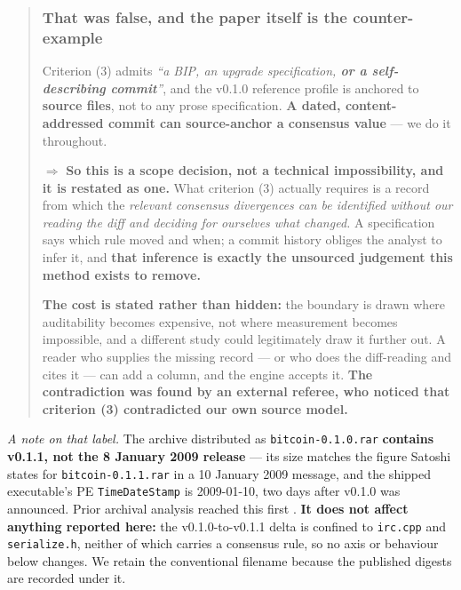 \documentclass[
]{article}
\begin{document}
\begin{quote}
\mbox{}%
\subsubsection{That was false, and the paper itself is the
counter-example}\label{that-was-false-and-the-paper-itself-is-the-counter-example}

Criterion (3) admits \emph{``a BIP, an upgrade specification, \textbf{or
a self-describing commit}''}, and the v0.1.0 reference profile is
anchored to \textbf{source files}, not to any prose specification.
\textbf{A dated, content-addressed commit can source-anchor a consensus
value} --- we do it throughout.

\(\Rightarrow\) \textbf{So this is a scope decision, not a technical
impossibility, and it is restated as one.} What criterion (3) actually
requires is a record from which the \emph{relevant consensus divergences
can be identified without our reading the diff and deciding for
ourselves what changed.} A specification says which rule moved and when;
a commit history obliges the analyst to infer it, and \textbf{that
inference is exactly the unsourced judgement this method exists to
remove.}

\textbf{The cost is stated rather than hidden:} the boundary is drawn
where auditability becomes expensive, not where measurement becomes
impossible, and a different study could legitimately draw it further
out. A reader who supplies the missing record --- or who does the
diff-reading and cites it --- can add a column, and the engine accepts
it. \textbf{The contradiction was found by an external referee, who
noticed that criterion (3) contradicted our own source model.}
\end{quote}

\emph{A note on that label.} The archive distributed as
\texttt{bitcoin-0.1.0.rar} \textbf{contains v0.1.1, not the 8 January
2009 release} --- its size matches the figure Satoshi states for
\texttt{bitcoin-0.1.1.rar} in a 10 January 2009 message, and the shipped
executable's PE \texttt{TimeDateStamp} is 2009-01-10, two days after
v0.1.0 was announced. Prior archival analysis reached this first
\citep{chainbulletin}. \textbf{It does not affect anything reported
here:} the v0.1.0-to-v0.1.1 delta is confined to \texttt{irc.cpp} and
\texttt{serialize.h}, neither of which carries a consensus rule, so no
axis or behaviour below changes. We retain the conventional filename
because the published digests are recorded under it.
\end{document}
